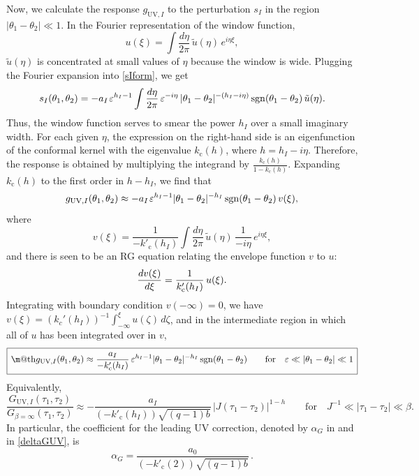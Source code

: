 \documentclass[12pt]{article}
\makeatletter
\newcommand*{\wideboxed}[1]{\setlength{\fboxsep}{1ex}%
  \fbox{\m@th$\displaystyle#1$}}
\DeclareMathOperator{\sgn}{sgn}
\newcommand{\cc}{\mathrm{c}}
\newcommand{\UV}{\text{UV}}
\newcommand{\vep}{\varepsilon}
\newcommand{\ov}{\over}
\makeatother
\begin{document}
Now, we calculate the response $g_{\UV,I}$ to the perturbation $s_I$ in the region $|\theta_1-\theta_2|\ll 1$. In the Fourier representation of the window function,
\begin{equation}
u(\xi)=\int\frac{d\eta}{2\pi}\,\tilde{u}(\eta)\,e^{i\eta\xi},
\end{equation}
$\tilde{u}(\eta)$ is concentrated at small values of $\eta$ because the window is wide. Plugging the Fourier expansion into \eqref{sIform}, we get
\begin{equation}\label{sIasym}
s_{I}(\theta_1,\theta_2)
= -a_I\kern1pt \vep^{h_I-1}
\int \frac{d\eta}{2\pi}\,\vep^{-i \eta}\,
|\theta_1-\theta_2|^{-(h_I-i\eta)}
\sgn(\theta_1-\theta_2)\,\tilde{u}(\eta).
\end{equation}
Thus, the window function serves to smear the power $h_I$ over a small imaginary width. For each given $\eta$, the expression on the right-hand side is an eigenfunction of the conformal kernel with the eigenvalue $k_{\cc}(h)$, where $h=h_I-i\eta$. Therefore, the response is obtained by multiplying the integrand by $\frac{k_{\cc}(h)}{1-k_{\cc}(h)}$. Expanding $k_{\cc}(h)$ to the first order in $h-h_I$, we find that
\begin{equation}
g_{\UV,I}(\theta_1,\theta_2)
\approx -a_I\kern1pt \vep^{h_I-1}
|\theta_1-\theta_2|^{-h_I}\sgn(\theta_1-\theta_2)\,v(\xi),
\end{equation}
where
\begin{equation}
v(\xi)=\frac{1}{-k'_{\cc}(h_I)}\int\frac{d\eta}{2\pi}\,\tilde{u}(\eta)\,
\frac{1}{-i\eta}\,e^{i\eta\xi},
\end{equation}
and there is seen to be an RG equation relating the envelope function $v$ to $u$:
\begin{equation} \label{RGeq}
{d v(\xi) \ov d \xi}= \frac{1}{k'_{\cc}(h_I)}\, u(\xi).
\end{equation}
Integrating with boundary condition $v(-\infty)=0$, we have $v(\xi)=(k_c'(h_I))^{-1}\int_{-\infty}^{\xi}u(\zeta)\,d\zeta$, and in the intermediate region in which all of $u$ has been integrated over in $v$,
\begin{equation} \label{intresp}
\wideboxed{
g_{\UV,I}(\theta_1, \theta_2)
\approx  \frac{a_I}{-k'_{\cc}(h_I)}\,\vep^{h_I-1}  |\theta_1-\theta_2|^{-h_I}\sgn(\theta_1-\theta_2) \qquad
\text{for}\quad \vep \ll |\theta_1-\theta_2| \ll 1
}
\end{equation}
Equivalently,
\begin{equation}
\frac{G_{\UV,I}(\tau_1,\tau_2)}{G_{\beta=\infty}(\tau_1,\tau_2)}
\approx -\frac{a_I}{(-k'_{\cc}(h_I))\sqrt{(q-1)b}}\,
\bigl|J(\tau_1-\tau_2)\bigr|^{1-h}\qquad
\text{for}\quad J^{-1}\ll |\tau_1-\tau_2|\ll \beta.
\end{equation}
In particular, the coefficient for the leading UV correction, denoted by $\alpha_{G}$ in \cite{MS16} and in \eqref{deltaGUV}, is
\begin{equation}\label{alpha_G}
\alpha_{G}=\frac{a_0}{(-k'_{\cc}(2))\sqrt{(q-1)b}}\,.
\end{equation}
\end{document}
